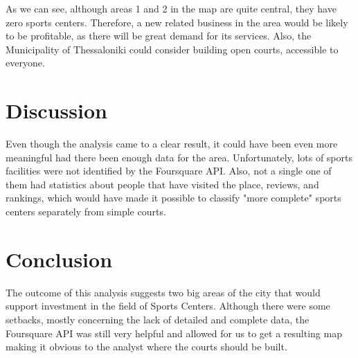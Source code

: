 \documentclass[11pt]{article}
\begin{document}
As we can see, although areas 1 and 2 in the map are quite central, they have zero sports centers. Therefore, a new related business in the area would be likely to be profitable, as there will be great demand for its services. Also, the Municipality of Thessaloniki could consider building open courts, accessible to everyone.

\pagebreak

\section{Discussion}
Even though the analysis came to a clear result, it could have been even more meaningful had there been enough data for the area. Unfortunately, lots of sports facilities were not identified by the Foursquare API. Also, not a single one of them had statistics about people that have visited the place, reviews, and rankings, which would have made it possible to classify "more complete" sports centers separately from simple courts. 

\section{Conclusion}
The outcome of this analysis suggests two big areas of the city that would support investment in the field of Sports Centers. Although there were some setbacks, mostly concerning the lack of detailed and complete data, the Foursquare API was still very helpful and allowed for us to get a resulting map making it obvious to the analyst where the courts should be built.
\end{document}
